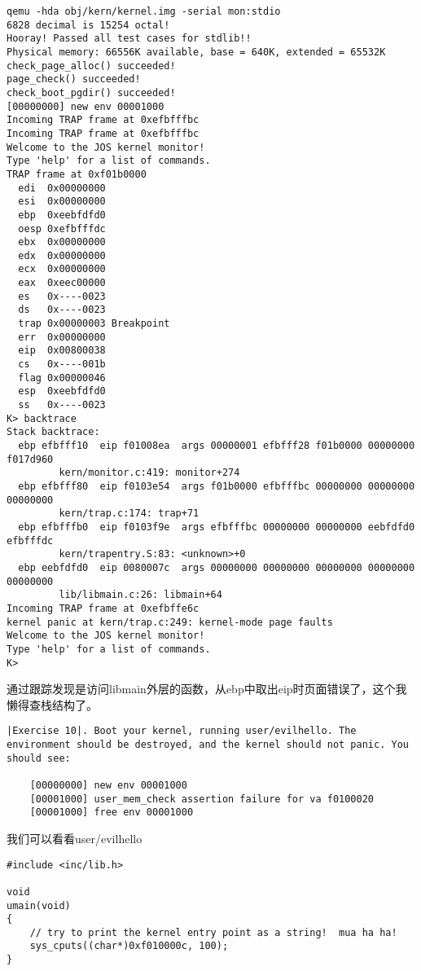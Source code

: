 \documentclass{article}
\begin{document}
\begin{CJK*}{UTF8}{gkai}
\begin{lstlisting}[style=console]
qemu -hda obj/kern/kernel.img -serial mon:stdio
6828 decimal is 15254 octal!
Hooray! Passed all test cases for stdlib!!
Physical memory: 66556K available, base = 640K, extended = 65532K
check_page_alloc() succeeded!
page_check() succeeded!
check_boot_pgdir() succeeded!
[00000000] new env 00001000
Incoming TRAP frame at 0xefbfffbc
Incoming TRAP frame at 0xefbfffbc
Welcome to the JOS kernel monitor!
Type 'help' for a list of commands.
TRAP frame at 0xf01b0000
  edi  0x00000000
  esi  0x00000000
  ebp  0xeebfdfd0
  oesp 0xefbfffdc
  ebx  0x00000000
  edx  0x00000000
  ecx  0x00000000
  eax  0xeec00000
  es   0x----0023
  ds   0x----0023
  trap 0x00000003 Breakpoint
  err  0x00000000
  eip  0x00800038
  cs   0x----001b
  flag 0x00000046
  esp  0xeebfdfd0
  ss   0x----0023
K> backtrace
Stack backtrace:
  ebp efbfff10  eip f01008ea  args 00000001 efbfff28 f01b0000 00000000 f017d960
         kern/monitor.c:419: monitor+274
  ebp efbfff80  eip f0103e54  args f01b0000 efbfffbc 00000000 00000000 00000000
         kern/trap.c:174: trap+71
  ebp efbfffb0  eip f0103f9e  args efbfffbc 00000000 00000000 eebfdfd0 efbfffdc
         kern/trapentry.S:83: <unknown>+0
  ebp eebfdfd0  eip 0080007c  args 00000000 00000000 00000000 00000000 00000000
         lib/libmain.c:26: libmain+64
Incoming TRAP frame at 0xefbffe6c
kernel panic at kern/trap.c:249: kernel-mode page faults
Welcome to the JOS kernel monitor!
Type 'help' for a list of commands.
K> 
\end{lstlisting}

通过跟踪发现是访问libmain外层的函数，从ebp中取出eip时页面错误了，这个我懒得查栈结构了。

\vspace{2em}

\begin{lstlisting}[style=exercise]
|Exercise 10|. Boot your kernel, running user/evilhello. The environment should be destroyed, and the kernel should not panic. You should see:

	[00000000] new env 00001000
	[00001000] user_mem_check assertion failure for va f0100020
	[00001000] free env 00001000
\end{lstlisting}

我们可以看看user/evilhello

\begin{lstlisting}[style=ccode, title={\scriptsize \ttfamily \bfseries user/evilhello.c}]
#include <inc/lib.h>

void
umain(void)
{
	// try to print the kernel entry point as a string!  mua ha ha!
	sys_cputs((char*)0xf010000c, 100);
}
\end{lstlisting}


\end{CJK*}
\end{document}
